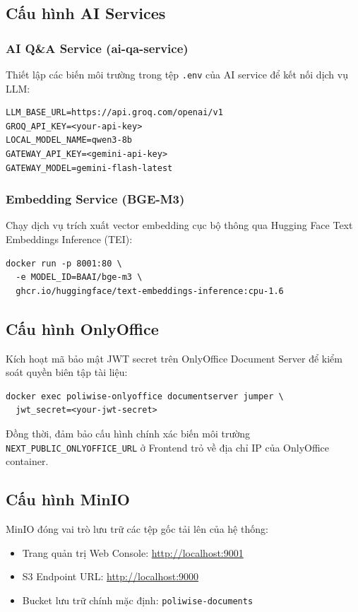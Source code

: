 \documentclass[12pt,a4paper]{report}
\begin{document}
\subsection{Cấu hình AI Services}

\subsubsection{AI Q\&A Service (ai-qa-service)}
Thiết lập các biến môi trường trong tệp \texttt{.env} của AI service để kết nối dịch vụ LLM:
\begin{verbatim}
LLM_BASE_URL=https://api.groq.com/openai/v1
GROQ_API_KEY=<your-api-key>
LOCAL_MODEL_NAME=qwen3-8b
GATEWAY_API_KEY=<gemini-api-key>
GATEWAY_MODEL=gemini-flash-latest
\end{verbatim}

\subsubsection{Embedding Service (BGE-M3)}
Chạy dịch vụ trích xuất vector embedding cục bộ thông qua Hugging Face Text Embeddings Inference (TEI):
\begin{verbatim}
docker run -p 8001:80 \
  -e MODEL_ID=BAAI/bge-m3 \
  ghcr.io/huggingface/text-embeddings-inference:cpu-1.6
\end{verbatim}

\subsection{Cấu hình OnlyOffice}
Kích hoạt mã bảo mật JWT secret trên OnlyOffice Document Server để kiểm soát quyền biên tập tài liệu:
\begin{verbatim}
docker exec poliwise-onlyoffice documentserver jumper \
  jwt_secret=<your-jwt-secret>
\end{verbatim}
Đồng thời, đảm bảo cấu hình chính xác biến môi trường \texttt{NEXT\_PUBLIC\_ONLYOFFICE\_URL} ở Frontend trỏ về địa chỉ IP của OnlyOffice container.

\subsection{Cấu hình MinIO}
MinIO đóng vai trò lưu trữ các tệp gốc tải lên của hệ thống:
\begin{itemize}
    \item Trang quản trị Web Console: \url{http://localhost:9001}
    \item S3 Endpoint URL: \url{http://localhost:9000}
    \item Bucket lưu trữ chính mặc định: \texttt{poliwise-documents}
\end{itemize}
\end{document}
